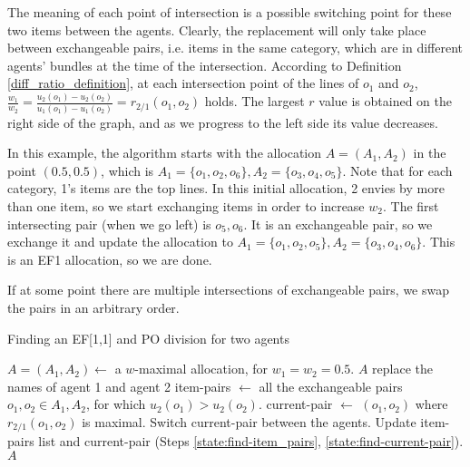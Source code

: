 \documentclass[sigconf]{aamas}
\theoremstyle{definition}
\begin{document}
The meaning of each point of intersection is a possible switching point for these two items between the agents.
Clearly, the replacement will only take place between exchangeable pairs, i.e. items in the same category, which are in different agents' bundles at the time of the intersection.
According to Definition \ref{diff_ratio_definition}, at each intersection point of the lines of $o_1$ and $o_2$, $\frac{w_1}{w_2} = \frac{u_2(o_1)-u_2(o_2)}{u_1(o_1)-u_1(o_2)} = r_{2/1}(o_1, o_2)$ holds.  
The largest $r$ value is obtained on the right side of the graph, and as we progress to the left side its value decreases.

In this example, the algorithm starts with the allocation $A=(A_1,A_2)$ in the point $(0.5,0.5)$, which is $A_1=\{o_1,o_2,o_6\}, A_2=\{o_3,o_4,o_5\}$.
Note that for each category, 1's items are the top lines.
In this initial allocation, 2 envies by more than one item, so we start exchanging items in order to increase $w_2$.
The first intersecting pair (when we go left) is $o_5,o_6$. It is an exchangeable pair, so we exchange it and update the allocation to $A_1=\{o_1,o_2,o_5\}, A_2=\{o_3,o_4,o_6\}$. This is an EF1 allocation, so we are done.

If at some point there are multiple intersections of exchangeable pairs, we swap the pairs in an arbitrary order.

\begin{algorithm}[tb]
\caption{Finding an EF[1,1] and PO division for two agents}
\label{alg:main}
\begin{algorithmic}[1]
\State \label{state:first-allocation} $A=(A_1,A_2) \gets$ a $w$-maximal allocation, for $w_1 = w_2 = 0.5$.
    \State \Return $A$
\EndIf
{}
    \State replace the names of agent 1 and agent 2
\EndIf
{}
\State \label{state:find-item_pairs} item-pairs $\gets$ all the exchangeable pairs $o_1, o_2\in A_1,A_2$, for which $u_2(o_1)>u_2(o_2)$. %
\State \label{state:find-current-pair} current-pair $\gets$ $(o_1,o_2)$ where $r_{2/1}(o_1,o_2)$ is maximal.
    \State Switch current-pair between the agents.
    \State Update item-pairs list and current-pair (Steps \ref{state:find-item_pairs}, \ref{state:find-current-pair}).
\EndWhile
\State \Return $A$
\end{algorithmic}
\end{algorithm}
\end{document}
